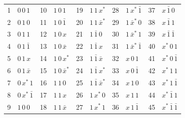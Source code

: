 \begin{tabular}{rl@{\qquad}rl@{\qquad}rl@{\qquad}rl@{\qquad}rl}
\hline
1 & $0\,0\,1$ & 10 & $1\,0\,1$ & 19 & $1\,1\,x^{*}$ & 28 & $1\,x^{*}\,\bar 1$ & 37 & $x\,\bar 1\,0$ \\
2 & $0\,1\,0$ & 11 & $1\,0\,\bar 1$ & 20 & $1\,1\,\bar x^{*}$ & 29 & $1\,\bar x^{*}\,0$ & 38 & $x\,\bar 1\,1$ \\
3 & $0\,1\,1$ & 12 & $1\,0\,x$ & 21 & $1\,\bar 1\,0$ & 30 & $1\,\bar x^{*}\,1$ & 39 & $x\,\bar 1\,\bar 1$ \\
4 & $0\,1\,\bar 1$ & 13 & $1\,0\,\bar x$ & 22 & $1\,\bar 1\,x$ & 31 & $1\,\bar x^{*}\,\bar 1$ & 40 & $x^{*}\,0\,1$ \\
5 & $0\,1\,x$ & 14 & $1\,0\,x^{*}$ & 23 & $1\,\bar 1\,\bar x$ & 32 & $x\,0\,1$ & 41 & $x^{*}\,0\,\bar 1$ \\
6 & $0\,1\,\bar x$ & 15 & $1\,0\,\bar x^{*}$ & 24 & $1\,\bar 1\,x^{*}$ & 33 & $x\,0\,\bar 1$ & 42 & $x^{*}\,1\,1$ \\
7 & $0\,x^{*}\,1$ & 16 & $1\,1\,0$ & 25 & $1\,\bar 1\,\bar x^{*}$ & 34 & $x\,1\,0$ & 43 & $x^{*}\,1\,\bar 1$ \\
8 & $0\,x^{*}\,\bar 1$ & 17 & $1\,1\,x$ & 26 & $1\,x^{*}\,0$ & 35 & $x\,1\,1$ & 44 & $x^{*}\,\bar 1\,1$ \\
9 & $1\,0\,0$ & 18 & $1\,1\,\bar x$ & 27 & $1\,x^{*}\,1$ & 36 & $x\,1\,\bar 1$ & 45 & $x^{*}\,\bar 1\,\bar 1$ \\
\hline
\end{tabular}
